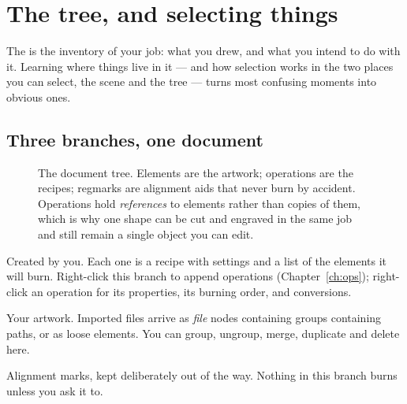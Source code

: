 \chapter{The tree, and selecting things}
\label{ch:tree}

The  is the inventory of your job: what you drew, and what you intend
to do with it. Learning where things live in it --- and how selection works in
the two places you can select, the scene and the tree --- turns most confusing
moments into obvious ones.

\section{Three branches, one document}

\begin{figure}[htbp]
\centering
{}
\caption{The document tree. Elements are the artwork; operations are the recipes;
regmarks are alignment aids that never burn by accident. Operations hold
\emph{references} to elements rather than copies of them, which is why one shape
can be cut and engraved in the same job and still remain a single object you can
edit.}
\label{fig:tree}
\end{figure}

\begin{description}[leftmargin=1.4em,style=nextline]
  \item[\emph{Operations}] Created by you. Each one is a recipe with settings and
        a list of the elements it will burn. Right-click this branch to append
        operations (Chapter~\ref{ch:ops}); right-click an operation for its
        properties, its burning order, and conversions.
  \item[\emph{Elements}] Your artwork. Imported files arrive as \emph{file} nodes
        containing groups containing paths, or as loose elements. You can group,
        ungroup, merge, duplicate and delete here.
  \item[\emph{Regmarks}] Alignment marks, kept deliberately out of the way.
        Nothing in this branch burns unless you ask it to.
\end{description}

